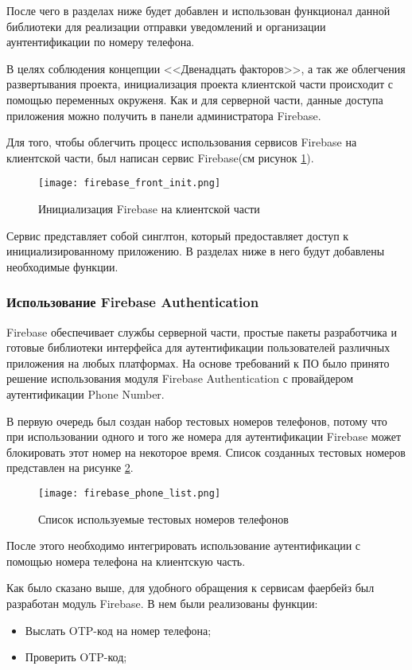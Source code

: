 После чего в разделах ниже будет добавлен и использован функционал данной библиотеки для реализации отправки уведомлений и организации аунтентификации по номеру телефона.


В целях соблюдения концепции <<Двенадцать факторов>>, а так же облегчения развертывания проекта, инициализация проекта клиентской части происходит с помощью переменных окруженя.
Как и для серверной части, данные доступа приложения можно получить в панели администратора Firebase.

Для того, чтобы облегчить процесс использования сервисов Firebase на клиентской части, был написан сервис Firebase(см рисунок \ref{fire:front:init}).

\begin{figure}[ht]
    \centering
    \texttt{[image: firebase\_front\_init.png]}
    \caption{ Инициализация Firebase на клиентской части }
    \label{fire:front:init}
\end{figure}

Сервис представляет собой синглтон, который предоставляет доступ к инициализированному приложению.
В разделах ниже в него будут добавлены необходимые функции.

\subsubsection{Использование Firebase Authentication}\hfill

Firebase обеспечивает службы серверной части, простые пакеты разработчика и готовые библиотеки интерфейса для аутентификации пользователей различных приложения на любых платформах.
На основе требований к ПО было принято решение использования модуля Firebase Authentication с провайдером аутентификации Phone Number.

В первую очередь был создан набор тестовых номеров телефонов, потому что при использовании одного и того же номера для аутентификации Firebase может блокировать этот номер на некоторое время.
Список созданных тестовых номеров представлен на рисунке \ref{fire:phones}.
\begin{figure}[ht]
    \centering
    \texttt{[image: firebase\_phone\_list.png]}
    \caption{ Список используемые тестовых номеров телефонов }
    \label{fire:phones}
\end{figure}

После этого необходимо интегрировать использование аутентификации с помощью номера телефона на клиентскую часть.

Как было сказано выше, для удобного обращения к сервисам фаербейз был разработан модуль Firebase.
В нем были реализованы функции:
\begin{itemize}
    \item Выслать OTP-код на номер телефона;
    \item Проверить OTP-код;
\end{itemize}

